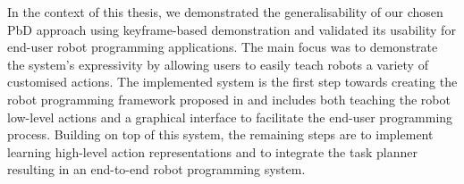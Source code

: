 In the context of this thesis, we demonstrated the generalisability of our chosen PbD approach using keyframe-based demonstration and validated its usability for end-user robot programming applications.
The main focus was to demonstrate the system's expressivity by allowing users to easily teach robots a variety of customised actions.
The implemented system is the first step towards creating the robot programming framework proposed in  and includes both teaching the robot low-level actions and a graphical interface to facilitate the end-user programming process.
Building on top of this system, the remaining steps are to implement learning high-level action representations and to integrate the task planner resulting in an end-to-end robot programming system.